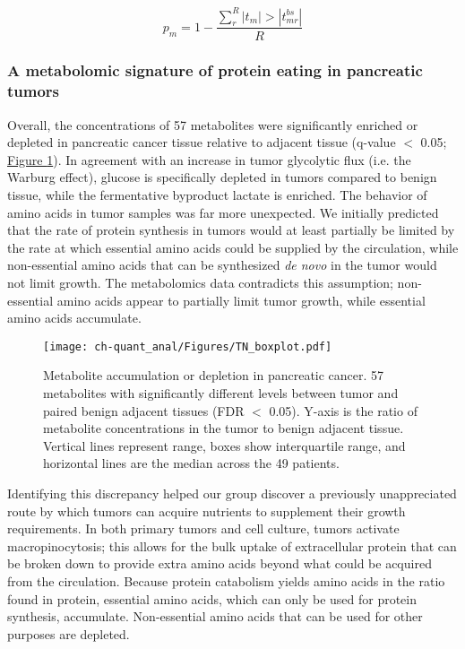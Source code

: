 \begin{equation}
p_{m} = 1 - \frac{\sum_{r}^{R}|t_{m}| > |t_{mr}^{bs}|}{R}\label{ch-quant_anal:bspval}
\end{equation}

\subsubsection{A metabolomic signature of protein eating in pancreatic tumors}

Overall, the concentrations of 57 metabolites were significantly enriched or depleted in pancreatic cancer tissue relative to adjacent tissue (q-value $<$ 0.05; \hyperref[ch-quant_anal:tnboxplot]{Figure \ref{ch-quant_anal:tnboxplot}}).  In agreement with an increase in tumor glycolytic flux (i.e. the Warburg effect), glucose is specifically depleted in tumors compared to benign tissue, while the fermentative byproduct lactate is enriched.  The behavior of amino acids in tumor samples was far more unexpected.  We initially predicted that the rate of protein synthesis in tumors would at least partially be limited by the rate at which essential amino acids could be supplied by the circulation, while non-essential amino acids that can be synthesized \textit{de novo} in the tumor would not limit growth. The metabolomics data contradicts this assumption; non-essential amino acids appear to partially limit tumor growth, while essential amino acids accumulate. 

\begin{figure}[h!]
\begin{center}
\texttt{[image: ch-quant\_anal/Figures/TN\_boxplot.pdf]}
\caption[Metabolite accumulation or depletion in pancreatic cancer]{Metabolite accumulation or depletion in pancreatic cancer. 57 metabolites with significantly different levels between tumor and paired benign adjacent tissues (FDR $<$ 0.05). Y-axis is the ratio of metabolite concentrations in the tumor to benign adjacent tissue. Vertical lines represent range, boxes show interquartile range, and horizontal lines are the median across the 49 patients.}
\label{ch-quant_anal:tnboxplot}
\end{center}
\end{figure}

Identifying this discrepancy helped our group discover a previously unappreciated route by which tumors can acquire nutrients to supplement their growth requirements.  In both primary tumors and cell culture, tumors activate macropinocytosis; this allows for the bulk uptake of extracellular protein that can be broken down to provide extra amino acids beyond what could be acquired from the circulation. Because protein catabolism yields amino acids in the ratio found in protein, essential amino acids, which can only be used for protein synthesis, accumulate. Non-essential amino acids that can be used for other purposes are depleted.


